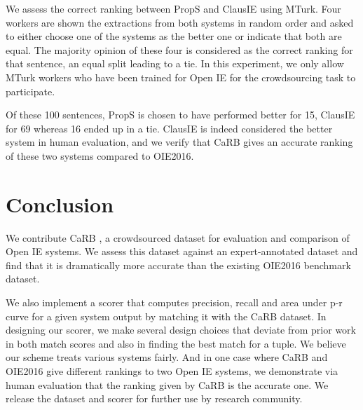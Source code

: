         We assess the correct ranking between PropS and ClausIE using MTurk. Four workers are shown the extractions from both systems in random order and asked to either choose one of the systems as the better one or indicate that both are equal. The majority opinion of these four is considered as the correct ranking for that sentence, an equal split leading to a tie. In this experiment, we only allow MTurk workers who have been trained for Open IE for the crowdsourcing task to participate.

        Of these 100 sentences, PropS is chosen to have performed better for 15, ClausIE for 69 whereas 16 ended up in a tie. ClausIE is indeed considered the better system in human evaluation, and we verify that CaRB gives an accurate ranking of these two systems compared to OIE2016. 

\section{Conclusion}
    We contribute CaRB \citep{bhardwaj&al19}, a crowdsourced dataset for evaluation and comparison of Open IE systems. We assess this dataset against an expert-annotated dataset and find that it is dramatically more accurate than the existing OIE2016 benchmark dataset. 

    We also implement a scorer that computes precision, recall and area under p-r curve for a given system output by matching it with the CaRB dataset. In designing our scorer, we make several design choices that deviate from prior work in both match scores and also in finding the best match for a tuple. We believe our scheme treats various systems fairly. And in one case where CaRB and OIE2016 give different rankings to two Open IE systems, we demonstrate via human evaluation that the ranking given by CaRB is the accurate one. We release the dataset and scorer for further use by research community. 

